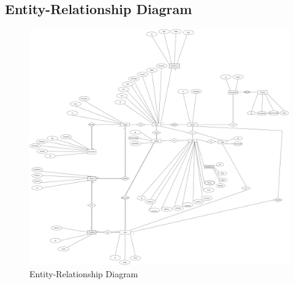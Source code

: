 \documentclass[12pt,a4paper]{report}
\begin{document}
\subsection{Entity-Relationship Diagram}
\begin{figure}[htbp]
    \centering
    \includegraphics[width=1\textwidth]{er-diagram.png}
    \caption{Entity-Relationship Diagram}
    \label{fig:er-diagram}
\end{figure}
\end{document}
